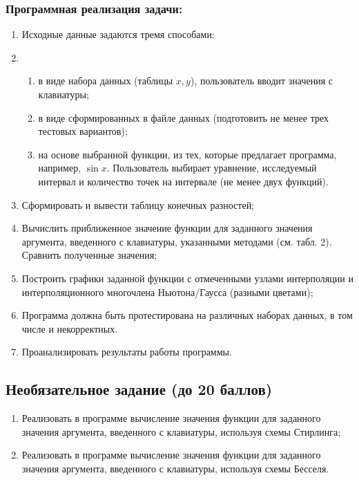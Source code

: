 \documentclass{article}
\begin{document}
            \subsubsection{Программная реализация задачи:}
            \begin{enumerate}
                  \item Исходные данные задаются тремя способами:
                  \item \begin{enumerate}
                        \item в виде набора данных (таблицы $x,y$), пользователь вводит значения с клавиатуры;
                        \item в виде сформированных в файле данных (подготовить не менее трех тестовых вариантов);
                        \item на основе выбранной функции, из тех, которые предлагает программа, например, $\sin x$. Пользователь выбирает уравнение, исследуемый интервал и количество точек на интервале (не менее двух функций).
                  \end{enumerate}
                  \item Сформировать и вывести таблицу конечных разностей;
                  \item Вычислить приближенное значение функции для заданного значения аргумента, введенного с клавиатуры, указанными методами (см. табл. 2). Сравнить полученные значения;
                  \item Построить графики заданной функции с отмеченными узлами интерполяции и интерполяционного многочлена Ньютона/Гаусса (разными цветами);
                  \item Программа должна быть протестирована на различных наборах данных, в том числе и некорректных.
                  \item Проанализировать результаты работы программы.
            \end{enumerate}
            
      \subsection{Необязательное задание (до 20 баллов)}
            \begin{enumerate}
                  \item Реализовать в программе вычисление значения функции для заданного значения аргумента, введенного с клавиатуры, используя схемы Стирлинга;
                  \item Реализовать в программе вычисление значения функции для заданного значения аргумента, введенного с клавиатуры, используя схемы Бесселя.
            \end{enumerate}
      
\end{document}
